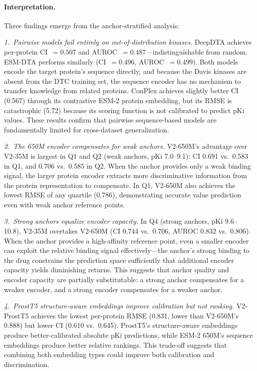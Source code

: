 \paragraph{Interpretation.}
Three findings emerge from the anchor-stratified analysis:

\textit{1.~Pairwise models fail entirely on out-of-distribution kinases.}
DeepDTA achieves per-protein CI~$= 0.507$ and AUROC~$= 0.487$---indistinguishable from random.
ESM-DTA performs similarly (CI~$= 0.496$, AUROC~$= 0.499$).
Both models encode the target protein's sequence directly, and because the Davis kinases are absent from the DTC training set, the sequence encoder has no mechanism to transfer knowledge from related proteins.
ConPlex achieves slightly better CI (0.567) through its contrastive ESM-2 protein embedding, but its RMSE is catastrophic (5.72) because its scoring function is not calibrated to predict pKi values.
These results confirm that pairwise sequence-based models are fundamentally limited for cross-dataset generalization.

\textit{2.~The 650M encoder compensates for weak anchors.}
V2-650M's advantage over V2-35M is largest in Q1 and Q2 (weak anchors, pKi 7.0--9.1): CI 0.691 vs.\ 0.583 in Q1, and 0.706 vs.\ 0.585 in Q2.
When the anchor provides only a weak binding signal, the larger protein encoder extracts more discriminative information from the protein representation to compensate.
In Q1, V2-650M also achieves the lowest RMSE of any quartile (0.786), demonstrating accurate value prediction even with weak anchor reference points.

\textit{3.~Strong anchors equalize encoder capacity.}
In Q4 (strong anchors, pKi 9.6--10.8), V2-35M overtakes V2-650M (CI 0.744 vs.\ 0.706, AUROC 0.832 vs.\ 0.806).
When the anchor provides a high-affinity reference point, even a smaller encoder can exploit the relative binding signal effectively---the anchor's strong binding to the drug constrains the prediction space sufficiently that additional encoder capacity yields diminishing returns.
This suggests that anchor quality and encoder capacity are partially substitutable: a strong anchor compensates for a weaker encoder, and a strong encoder compensates for a weaker anchor.

\textit{4.~ProstT5 structure-aware embeddings improve calibration but not ranking.}
V2-ProstT5 achieves the lowest per-protein RMSE (0.831, lower than V2-650M's 0.888) but lower CI (0.610 vs.\ 0.645).
ProstT5's structure-aware embeddings produce better-calibrated absolute pKi predictions, while ESM-2 650M's sequence embeddings produce better relative rankings.
This trade-off suggests that combining both embedding types could improve both calibration and discrimination.

